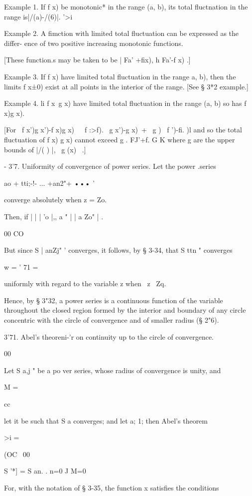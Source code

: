 Example 1. If f x) be monotonic* in the range (a, b), its total
fluctnation in the range is|/(a)-/(6)|. '>i

Example 2. A fimction with limited total fluctuation can be expressed
as the differ- ence of two positive increasing monotonic functions.

[These function.s may be taken to be | Fa' +fix), h Fa'-f x) .]

Example 3. If f x) have limited total fluctuation in the range a, b),
then the limits f x±0) exist at all points in the interior of the
range. [See § 3*2 example.]

Example 4. li f x\ g x) have limited total fluctuation in the range
(a, b) so has f x)g x).

[For \ f x')g x')-f x)g x)\ \ \ f :>f). \ g x')-g x)\ + \ g ) \ f
')-fi. )l and so the total fluctuation of f x) g x) cannot exceed g .
FJ'+f. G K where g are the upper bounds of |/( ) |, \ g (x) \ .]

- 3'7. Uniformity of convergence of power series. Let the power
.series

ao + tti;-!- ... +an2"+ ••• '

converge absolutely when z = Zo.

Then, if | | | 'o |,, a " | | a Zo" | .

00 CO

But since S | anZj" ' converges, it follows, by § 3-34, that S ttn "
converges

w = ' 71 =

uniformly with regard to the variable z when \ z \ Zq.

Hence, by § 3"32, a power series is a continuous function of the
variable throughout the closed region formed by the interior and
boundary of any circle concentric with the circle of convergence and
of smaller radius (§ 2"6).

  3'71. Abel's theoreni-'r on continuity up to the circle of
convergence.

00

Let S a,j " be a po ver series, whose radius of convergence is unity,
and

M =

cc

let it be such that S a converges; and let a; 1; then Abel's theorem

>i =

(OC \ 00

S '*] = S an. . n=0 J M=0

For, with the notation of § 3-35, the function x satisfies the
conditions

